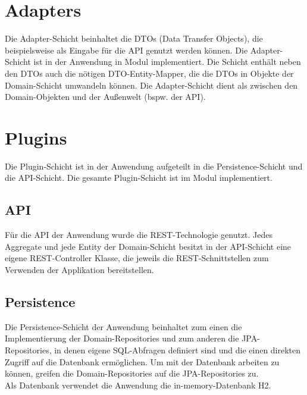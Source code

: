 \section{Adapters}
Die Adapter-Schicht beinhaltet die DTOs (Data Transfer Objects), die beispielsweise als Eingabe für die API genutzt werden können. Die Adapter-Schicht ist in der Anwendung in Modul  implementiert. Die Schicht enthält neben den DTOs auch die nötigen DTO-Entity-Mapper, die die DTOs in Objekte der Domain-Schicht umwandeln können. Die Adapter-Schicht dient als  zwischen den Domain-Objekten und der Außenwelt (bspw. der API).

\section{Plugins}
Die Plugin-Schicht ist in der Anwendung aufgeteilt in die Persistence-Schicht und die API-Schicht. Die gesamte Plugin-Schicht ist im Modul  implementiert.
\subsection*{API}
Für die API der Anwendung wurde die REST-Technologie genutzt. Jedes Aggregate und jede Entity der Domain-Schicht besitzt in der API-Schicht eine eigene REST-Controller Klasse, die jeweils die REST-Schnittstellen zum Verwenden der Applikation bereitstellen. 
\subsection*{Persistence}
Die Persistence-Schicht der Anwendung beinhaltet zum einen die Implementierung der Domain-Repositories und zum anderen die JPA-Repositories, in denen eigene SQL-Abfragen definiert sind und die einen direkten Zugriff auf die Datenbank ermöglichen. Um mit der Datenbank arbeiten zu können, greifen die Domain-Repositories auf die JPA-Repositories zu. \\
Als Datenbank verwendet die Anwendung die in-memory-Datenbank H2.